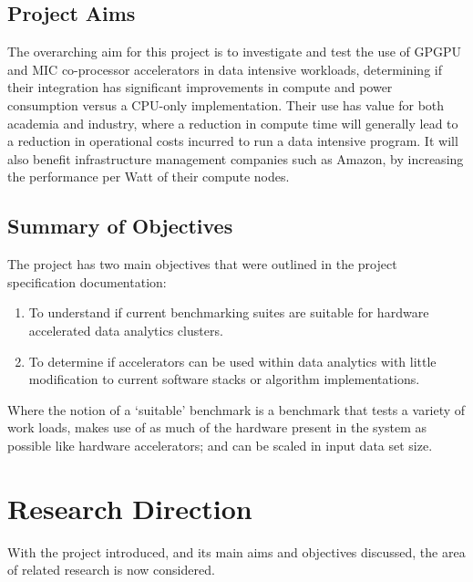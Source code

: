 \documentclass[12pt,a4paper]{article}
\begin{document}
	    \subsection{Project Aims}
	    \label{sub:project_aims}
	    
	        The overarching aim for this project is to investigate and test the use of GPGPU and MIC co-processor accelerators in data intensive workloads, determining if their integration has significant improvements in compute and power consumption versus a CPU-only implementation. Their use has value for both academia and industry, where a reduction in compute time will generally lead to a reduction in operational costs incurred to run a data intensive program. It will also benefit infrastructure management companies such as Amazon, by increasing the performance per Watt of their compute nodes.
	        
	    \subsection{Summary of Objectives}
	    \label{sub:summary_of_objectives}
	    
	        The project has two main objectives that were outlined in the project specification documentation:
	        
	        \begin{enumerate}
	           \item To understand if current benchmarking suites are suitable for hardware accelerated data analytics clusters.
	           \item To determine if accelerators can be used within data analytics with little modification to current software stacks or algorithm implementations.
	        \end{enumerate}
	        
	        Where the notion of a `suitable' benchmark is a benchmark that tests a variety of work loads, makes use of as much of the hardware present in the system as possible like hardware accelerators; and can be scaled in input data set size.
	    
    \section{Research Direction}
    \label{sec:research_direction}
    

        With the project introduced, and its main aims and objectives discussed, the area of related research is now considered.
    
\end{document}
